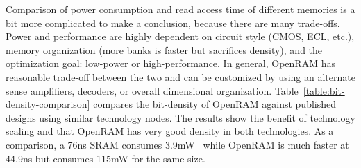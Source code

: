 Comparison of power consumption and read access time of different
memories is a bit more complicated to make a conclusion, because there
are many trade-offs. Power and performance are highly dependent on
circuit style (CMOS, ECL, etc.), memory organization (more banks is
faster but sacrifices density), and the optimization goal: low-power
or high-performance.  In general, OpenRAM has reasonable trade-off
between the two and can be customized by using an alternate sense
amplifiers, decoders, or overall dimensional organization.
Table~\ref{table:bit-density-comparison} compares the bit-density of
OpenRAM against published designs using similar technology nodes. The
results show the benefit of technology scaling and that OpenRAM has
very good density in both technologies.  As a comparison, a 76ns SRAM
consumes 3.9mW~\cite{Bit_Density_5} while OpenRAM is much faster at
44.9ns but consumes 115mW for the same size. 




